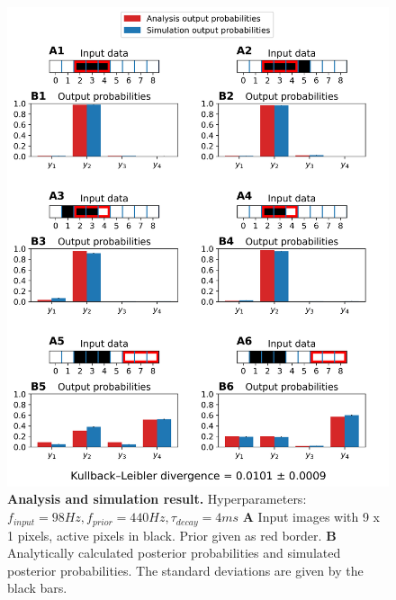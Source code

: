 \begin{figure}
  \includegraphics[width=\linewidth]{figures/1D/1D_98_440_4.png}
    \caption{\textbf{Analysis and simulation result. } Hyperparameters: $f_{input} = 98 Hz, f_{prior} = 440 Hz, \tau_{decay} = 4 ms$ \textbf{A} Input images with 9 x 1 pixels, active pixels in black. Prior given as red border. \textbf{B} Analytically calculated posterior probabilities and simulated posterior probabilities. The standard deviations are given by the black bars.}
  \label{fig:1D_98_440_4}
\end{figure}

